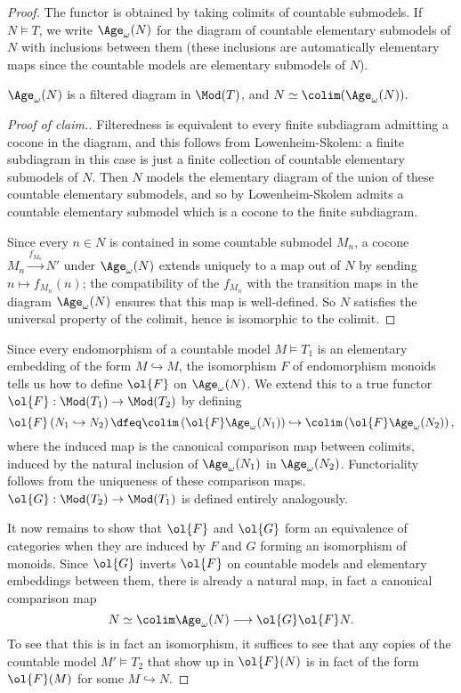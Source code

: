 \begin{proof}
The functor is obtained by taking colimits of countable submodels. If $N \models T$, we write $\Age_{\omega}(N)$ for the diagram of countable elementary submodels of $N$ with inclusions between them (these inclusions are automatically elementary maps since the countable models are elementary submodels of $N$).

\begin{description}
\item $\Age_{\omega}(N)$ is a filtered diagram in $\Mod(T)$, and $N \simeq \colim(\Age_{\omega}(N)).$
\begin{proof}[Proof of claim.]
Filteredness is equivalent to every finite subdiagram admitting a cocone in the diagram, and this follows from Lowenheim-Skolem: a finite subdiagram in this case is just a finite collection of countable elementary submodels of $N$. Then $N$ models the elementary diagram of the union of these countable elementary submodels, and so by Lowenheim-Skolem admits a countable elementary submodel which is a cocone to the finite subdiagram.

Since every $n \in N$ is contained in some countable submodel $M_n$, a cocone $M_n \overset{f_{M_n}}{\to} N'$ under $\Age_{\omega}(N)$ extends uniquely to a map out of $N$ by sending $n \mapsto f_{M_n}(n)$; the compatibility of the $f_{M_n}$ with the transition maps in the diagram $\Age_{\omega}(N)$ ensures that this map is well-defined. So $N$ satisfies the universal property of the colimit, hence is isomorphic to the colimit.
\end{proof}
\end{description}

Since every endomorphism of a countable model $M \models T_1$ is an elementary embedding of the form $M \hookrightarrow M$, the isomorphism $F$ of endomorphism monoids tells us how to define $\ol{F}$ on $\Age_{\omega}(N)$. We extend this to a true functor $\ol{F} : \Mod(T_1) \to \Mod(T_2)$ by defining
$$
\ol{F} \left(N_1 \hookrightarrow N_2 \right) \dfeq \colim\left(\ol{F} \Age_{\omega}(N_1) \right) \hookrightarrow \colim \left(\ol{F} \Age_{\omega}(N_2)\right),
$$
where the induced map is the canonical comparison map between colimits, induced by the natural inclusion of $\Age_{\omega}(N_1)$ in $\Age_{\omega}(N_2)$. Functoriality follows from the uniqueness of these comparison maps. $\ol{G} : \Mod(T_2) \to \Mod(T_1)$ is defined entirely analogously.

It now remains to show that $\ol{F}$ and $\ol{G}$ form an equivalence of categories when they are induced by $F$ and $G$ forming an isomorphism of monoids. Since $\ol{G}$ inverts $\ol{F}$ on countable models and elementary embeddings between them, there is already a natural map, in fact a canonical comparison map $$N \simeq \colim \Age_{\omega}(N) \longrightarrow \ol{G} \ol{F} N.$$ To see that this is in fact an isomorphism, it suffices to see that any copies of the countable model $M' \models T_2$ that show up in $\ol{F}(N)$ is in fact of the form $\ol{F}(M)$ for some $M \hookrightarrow N.$


\end{proof}
